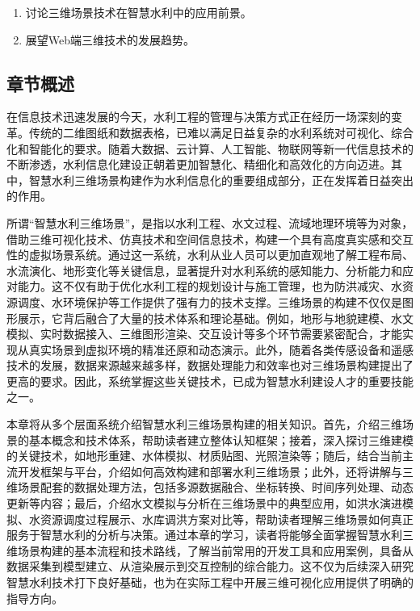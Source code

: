 \begin{enumerate}
\def\labelenumi{\arabic{enumi}.}
\tightlist
\item
  讨论三维场景技术在智慧水利中的应用前景。
\item
  展望Web端三维技术的发展趋势。
\end{enumerate}


\hypertarget{ux7ae0ux8282ux6982ux8ff0}{%
\subsection{章节概述}\label{ux7ae0ux8282ux6982ux8ff0}}

在信息技术迅速发展的今天，水利工程的管理与决策方式正在经历一场深刻的变革。传统的二维图纸和数据表格，已难以满足日益复杂的水利系统对可视化、综合化和智能化的要求。随着大数据、云计算、人工智能、物联网等新一代信息技术的不断渗透，水利信息化建设正朝着更加智慧化、精细化和高效化的方向迈进。其中，智慧水利三维场景构建作为水利信息化的重要组成部分，正在发挥着日益突出的作用。

所谓``智慧水利三维场景''，是指以水利工程、水文过程、流域地理环境等为对象，借助三维可视化技术、仿真技术和空间信息技术，构建一个具有高度真实感和交互性的虚拟场景系统。通过这一系统，水利从业人员可以更加直观地了解工程布局、水流演化、地形变化等关键信息，显著提升对水利系统的感知能力、分析能力和应对能力。这不仅有助于优化水利工程的规划设计与施工管理，也为防洪减灾、水资源调度、水环境保护等工作提供了强有力的技术支撑。三维场景的构建不仅仅是图形展示，它背后融合了大量的技术体系和理论基础。例如，地形与地貌建模、水文模拟、实时数据接入、三维图形渲染、交互设计等多个环节需要紧密配合，才能实现从真实场景到虚拟环境的精准还原和动态演示。此外，随着各类传感设备和遥感技术的发展，数据来源越来越多样，数据处理能力和效率也对三维场景构建提出了更高的要求。因此，系统掌握这些关键技术，已成为智慧水利建设人才的重要技能之一。

本章将从多个层面系统介绍智慧水利三维场景构建的相关知识。首先，介绍三维场景的基本概念和技术体系，帮助读者建立整体认知框架；接着，深入探讨三维建模的关键技术，如地形重建、水体模拟、材质贴图、光照渲染等；随后，结合当前主流开发框架与平台，介绍如何高效构建和部署水利三维场景；此外，还将讲解与三维场景配套的数据处理方法，包括多源数据融合、坐标转换、时间序列处理、动态更新等内容；最后，介绍水文模拟与分析在三维场景中的典型应用，如洪水演进模拟、水资源调度过程展示、水库调洪方案对比等，帮助读者理解三维场景如何真正服务于智慧水利的分析与决策。通过本章的学习，读者将能够全面掌握智慧水利三维场景构建的基本流程和技术路线，了解当前常用的开发工具和应用案例，具备从数据采集到模型建立、从渲染展示到交互控制的综合能力。这不仅为后续深入研究智慧水利技术打下良好基础，也为在实际工程中开展三维可视化应用提供了明确的指导方向。

